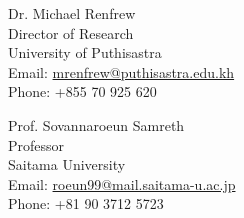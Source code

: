 \documentclass[10pt,a4paper]{article}
\begin{document}
\parbox{0.5\textwidth}{ %
	Dr. Michael Renfrew\\ 
	Director of Research\\
	University of Puthisastra\\ 
	Email: \href{mailto: mrenfrew@puthisastra.edu.kh}{mrenfrew@puthisastra.edu.kh}\\
	Phone: +855 70 925 620
}
\hfill %
\parbox{0.5\textwidth}{ %
	Prof. Sovannaroeun Samreth \\ 
	Professor \\
	Saitama University \\
	Email: \href{mailto: roeun99@mail.saitama-u.ac.jp}{roeun99@mail.saitama-u.ac.jp}\\
	Phone: +81 90 3712 5723
}
\end{document}
